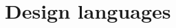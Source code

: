 	\section{Design languages} \label{s:view-template:design-languages}
		\begin{comment}
			Design languages are selected as a part of design viewpoint specification (4.5).
		
			A design language may be selected for a design viewpoint only if it supports all design elements defined by
			that viewpoint.
		
			Design languages shall be selected that have:
			⎯ A well-defined syntax and semantics; and
			⎯ The status of an available standard or equivalent defining document.
			
			Only standardized and well-established (i.e., previously defined and conveniently available) design
			languages shall be used in an SDD. In the case of a newly invented design language, the language
			definition must be provided as a part of the viewpoint declaration.
		
			NOTE 1—Standardized design languages that are in common use are preferable to established languages without a
			formal definition. Examples of standardized languages include: IDEF0 (IEEE Std 1320.1™-1998 [B18]); IDEF1X
			(IEEE Std 1320.2™-1998 [B19]); Unified Modeling Language (UML) (OMG [B28] and [B29]); Vienna Definition
			Method (VDM) (ISO/IEC 13817-1:1996 [B24]); and Z (ISO/IEC 13568:2002 [B23]). Examples of established
			languages include: state machines, automata, decision tables, Warnier diagrams, Jackson Structured Design (JSD),
			program design languages (PDL), structure charts, Hierarchy plus Input-Process-Output (HIPO), reliability models, and
			queuing models.
		
			NOTE 2—It is acceptable to use a design language in more than one view. It is also acceptable to use more than one
			design language within any number of views when each design language to be used is declared by the viewpoint. This
			is acceptable even for a portion of the design; for example, when used as a basis for interchange; due to organizational
			considerations such as development by non-collocated team members; subcontracting of partial design responsibility;
			or taking advantage of particular design tools or designer expertise.
		
			NOTE 3—Annex B establishes a uniform format for describing design languages to be used in SDDs.
			
			NOTE 4—In case that no adequate design language is readily available for a specified viewpoint, it is the designer’s
			responsibility to provide an adaptation of an existing language or the definition of an appropriate new design language.
			This design language definition would be provided by the designer to be included in the SDD in accordance with the
			requirements for viewpoints in 4.5.
		\end{comment}